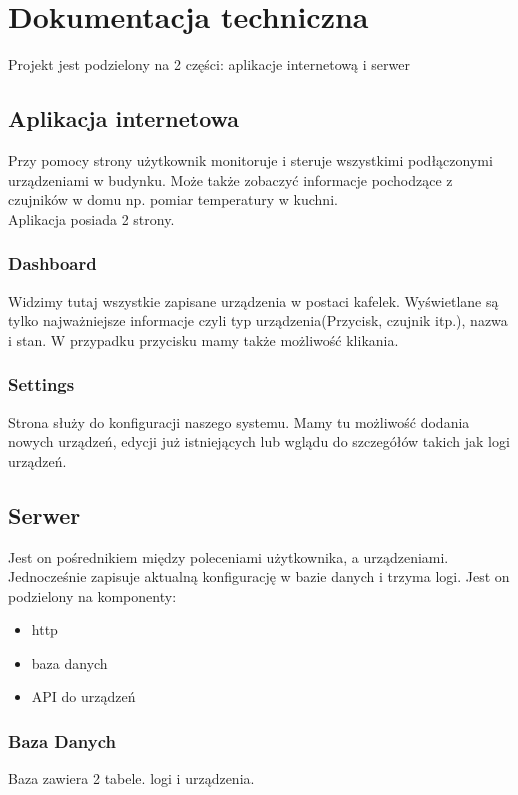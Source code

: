 \chapter{Dokumentacja techniczna}%
Projekt jest podzielony na 2 części: aplikacje internetową i serwer
\section{Aplikacja internetowa}
Przy pomocy strony użytkownik monitoruje i steruje wszystkimi podłączonymi urządzeniami w budynku. Może także zobaczyć informacje pochodzące z czujników w domu np. pomiar temperatury w kuchni. \\
Aplikacja posiada 2 strony.
\subsection{Dashboard}
Widzimy tutaj wszystkie zapisane urządzenia w postaci kafelek. Wyświetlane są tylko najważniejsze informacje czyli typ urządzenia(Przycisk, czujnik itp.), nazwa i stan. W przypadku przycisku mamy także możliwość klikania. 
\subsection{Settings}
Strona służy do konfiguracji naszego systemu. Mamy tu możliwość dodania nowych urządzeń, edycji już istniejących lub wglądu do szczegółów takich jak logi urządzeń.
\section{Serwer}
Jest on pośrednikiem między poleceniami użytkownika, a urządzeniami. Jednocześnie zapisuje aktualną konfigurację w bazie danych i trzyma logi. Jest on podzielony na komponenty:
\begin{itemize}
    \item http
    \item baza danych
    \item API do urządzeń
\end{itemize}
\subsection{Baza Danych}
Baza zawiera 2 tabele. logi i urządzenia. 